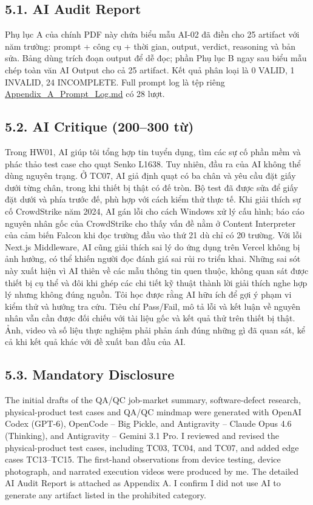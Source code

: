 \subsection{5.1. AI Audit Report}\label{ai-audit-report}

Phụ lục A của chính PDF này chứa biểu mẫu AI-02 đã điền cho 25 artifact với năm trường: prompt + công cụ + thời gian, output, verdict, reasoning và bản sửa. Bảng dùng trích đoạn output để dễ đọc; phần Phụ lục B ngay sau biểu mẫu chép toàn văn AI Output cho cả 25 artifact. Kết quả phân loại là 0 VALID, 1 INVALID, 24 INCOMPLETE. Full prompt log là tệp riêng \url{Appendix_A_Prompt_Log.md} có 28 lượt.

\subsection{5.2. AI Critique (200--300 từ)}\label{ai-critique-200300-tux1eeb}

Trong HW01, AI giúp tôi tổng hợp tin tuyển dụng, tìm các sự cố phần mềm và phác thảo test case cho quạt Senko L1638. Tuy nhiên, đầu ra của AI không thể dùng nguyên trạng. Ở TC07, AI giả định quạt có ba chân và yêu cầu đặt giấy dưới từng chân, trong khi thiết bị thật có đế tròn. Bộ test đã được sửa để giấy đặt dưới và phía trước đế, phù hợp với cách kiểm thử thực tế. Khi giải thích sự cố CrowdStrike năm 2024, AI gán lỗi cho cách Windows xử lý cấu hình; báo cáo nguyên nhân gốc của CrowdStrike cho thấy vấn đề nằm ở Content Interpreter của cảm biến Falcon khi đọc trường đầu vào thứ 21 dù chỉ có 20 trường. Với lỗi Next.js Middleware, AI cũng giải thích sai lý do ứng dụng trên Vercel không bị ảnh hưởng, có thể khiến người đọc đánh giá sai rủi ro triển khai. Những sai sót này xuất hiện vì AI thiên về các mẫu thông tin quen thuộc, không quan sát được thiết bị cụ thể và đôi khi ghép các chi tiết kỹ thuật thành lời giải thích nghe hợp lý nhưng không đúng nguồn. Tôi học được rằng AI hữu ích để gợi ý phạm vi kiểm thử và hướng tra cứu. Tiêu chí Pass/Fail, mô tả lỗi và kết luận về nguyên nhân vẫn cần được đối chiếu với tài liệu gốc và kết quả thử trên thiết bị thật. Ảnh, video và số liệu thực nghiệm phải phản ánh đúng những gì đã quan sát, kể cả khi kết quả khác với đề xuất ban đầu của AI.

\subsection{5.3. Mandatory Disclosure}\label{mandatory-disclosure}

The initial drafts of the QA/QC job-market summary, software-defect research, physical-product test cases and QA/QC mindmap were generated with OpenAI Codex (GPT-6), OpenCode -- Big Pickle, and Antigravity -- Claude Opus 4.6 (Thinking), and Antigravity -- Gemini 3.1 Pro. I reviewed and revised the physical-product test cases, including TC03, TC04, and TC07, and added edge cases TC13--TC15. The first-hand observations from device testing, device photograph, and narrated execution videos were produced by me. The detailed AI Audit Report is attached as Appendix A. I confirm I did not use AI to generate any artifact listed in the prohibited category.

